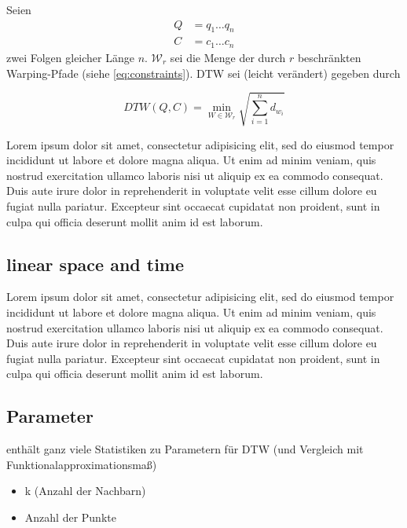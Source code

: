 Seien
\begin{align}
  Q &= q_1 \dots q_n \\
  C &= c_1 \dots c_n
\end{align}
zwei Folgen gleicher Länge $n$. \( \mathcal{W}_r \) sei die Menge der durch \(r\) beschränkten Warping-Pfade (siehe \ref{eq:constraints}). DTW sei (leicht verändert) gegeben durch

\begin{equation}
  \label{eq:keoghdtw}
  DTW(Q,C) = \min_{W \in \mathcal{W}_r}{\sqrt{\sum_{i=1}^n d_{w_i}}}
\end{equation}


Lorem ipsum dolor sit amet, consectetur adipisicing elit, sed do eiusmod tempor incididunt ut labore et dolore magna aliqua. Ut enim ad minim veniam, quis nostrud exercitation ullamco laboris nisi ut aliquip ex ea commodo consequat. Duis aute irure dolor in reprehenderit in voluptate velit esse cillum dolore eu fugiat nulla pariatur. Excepteur sint occaecat cupidatat non proident, sunt in culpa qui officia deserunt mollit anim id est laborum.


\subsection{linear space and time} %
\label{sec:linear_space_and_time}
Lorem ipsum dolor sit amet, consectetur adipisicing elit, sed do eiusmod tempor incididunt ut labore et dolore magna aliqua. Ut enim ad minim veniam, quis nostrud exercitation ullamco laboris nisi ut aliquip ex ea commodo consequat. Duis aute irure dolor in reprehenderit in voluptate velit esse cillum dolore eu fugiat nulla pariatur. Excepteur sint occaecat cupidatat non proident, sunt in culpa qui officia deserunt mollit anim id est laborum.

\subsection{\TODO Parameter} %
\label{sec:todo_parameter}


\citet{Golubitsky:2009p1842} enthält ganz viele Statistiken zu Parametern für DTW (und Vergleich mit Funktionalapproximationsmaß)
\begin{itemize}
  \item k (Anzahl der Nachbarn)
  \item Anzahl der Punkte
\end{itemize}


